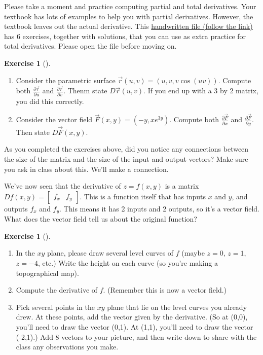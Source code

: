 \documentclass[10pt,]{book}
\theoremstyle{plain}
\theoremstyle{definition}
\theoremstyle{definition}
\theoremstyle{definition}
\theoremstyle{definition}
\newtheorem{exploration}[project]{Exercise}
\theoremstyle{definition}
\numberwithin{equation}{section}
\newcommand{\ds}{\displaystyle}
\newcommand{\amp}{&}
\begin{document}
Please take a moment and practice computing partial and total derivatives. Your textbook has lots of examples to help you with partial derivatives. However, the textbook leaves out the actual derivative. This \href{http://db.tt/cSeKG8XO}{handwritten file (follow the link)} has 6 exercises, together with solutions, that you can use as extra practice for total derivatives. Please open the file before moving on.%
\begin{exploration}[]\label{exploration-136}
\leavevmode%
\begin{enumerate}[font=\bfseries,label=(\alph*),ref=\alph*]
\item\label{task-287} Consider the parametric surface \(\vec r(u,v) = (u,v,v\cos(uv))\). Compute both \(\ds\frac{\partial \vec r}{\partial u}\) and \(\ds\frac{\partial \vec r}{\partial v}\). Thenm state \(D\vec r(u,v)\). If you end up with a 3 by 2 matrix, you did this correctly.%
\item\label{task-288} Consider the vector field \(\vec F(x,y) = (-y,xe^{3y})\). Compute both \(\ds\frac{\partial \vec F}{\partial x}\) and \(\ds\frac{\partial \vec F}{\partial y}\). Then state \(D\vec F(x,y)\).%
\end{enumerate}
\end{exploration}
As you completed the exercises above, did you notice any connections between the size of the matrix and the size of the input and output vectors? Make sure you ask in class about this. We'll make a connection.%
\par
We've now seen that the derivative of \(z=f(x,y)\) is a matrix \(Df(x,y) = \begin{bmatrix}f_x \amp  f_y
\end{bmatrix}\). This is a function itself that has inputs \(x\) and \(y\), and outputs \(f_x\) and \(f_y\). This means it has 2 inputs and 2 outputs, so it's a vector field. What does the vector field tell us about the original function?%
\begin{exploration}[]\label{exploration-137}
\leavevmode%
\begin{enumerate}[font=\bfseries,label=(\alph*),ref=\alph*]
\item\label{task-289} In the \(xy\) plane, please draw several level curves of \(f\) (maybe \(z=0\), \(z=1\), \(z=-4\), etc.)  Write the height on each curve (so you're making a topographical map).%
\item\label{task-290} Compute the derivative of \(f\). (Remember this is now a vector field.)%
\item\label{task-291} Pick several points in the \(xy\) plane that lie on the level curves you already drew.  At these points, add the vector given by the derivative.  (So at (0,0), you'll need to draw the vector (0,1).  At (1,1), you'll need to draw the vector (-2,1).) Add 8 vectors to your picture, and then write down to share with the class any observations you make.%
\end{enumerate}
\end{exploration}
\end{document}
